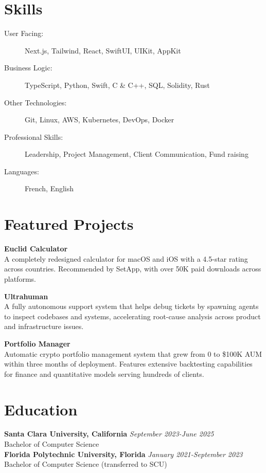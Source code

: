 \documentclass[margin,line]{resume}
\begin{document}
\begin{resume}
    \section{\mysidestyle Skills}\vspace{2mm}       
    \begin{description}
        \item[User Facing:] Next.js, Tailwind, React, SwiftUI, UIKit, AppKit
        \item[Business Logic:] TypeScript, Python, Swift, C \& C++, SQL, Solidity, Rust
        \item[Other Technologies:] Git, Linux, AWS, Kubernetes, DevOps, Docker
        \item[Professional Skills:] Leadership, Project Management, Client Communication, Fund raising
        \item[Languages:] French, English
    \end{description}
     
    
    \section{\mysidestyle Featured Projects}
    \begin{list2}
        \item \textbf{Euclid Calculator}\\
        A completely redesigned calculator for macOS and iOS with a 4.5-star rating across countries. Recommended by SetApp, with over 50K paid downloads across platforms.
        \vspace{1mm}
        \item \textbf{Ultrahuman}\\
        A fully autonomous support system that helps debug tickets by spawning agents to inspect codebases and systems, accelerating root-cause analysis across product and infrastructure issues.
        \vspace{1mm}
        \item \textbf{Portfolio Manager}\\
        Automatic crypto portfolio management system that grew from 0 to \$100K AUM within three months of deployment. Features extensive backtesting capabilities for finance and quantitative models serving hundreds of clients.
    \end{list2}


\section{\mysidestyle Education} 
\textbf{Santa Clara University, California} \hfill \textsl{September 2023-June 2025}\\
Bachelor of Computer Science\\
\vspace{1mm}
\textbf{Florida Polytechnic University, Florida} \hfill \textsl{January 2021-September 2023}\\
Bachelor of Computer Science (transferred to SCU)
    

\end{resume}
\end{document}
